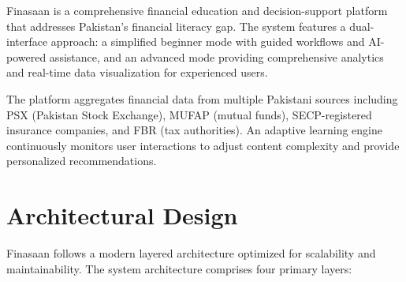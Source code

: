 \documentclass[12pt,a4paper]{report}
\begin{document}
Finasaan is a comprehensive financial education and decision-support platform that addresses Pakistan's financial literacy gap. The system features a dual-interface approach: a simplified beginner mode with guided workflows and AI-powered assistance, and an advanced mode providing comprehensive analytics and real-time data visualization for experienced users.

The platform aggregates financial data from multiple Pakistani sources including PSX (Pakistan Stock Exchange), MUFAP (mutual funds), SECP-registered insurance companies, and FBR (tax authorities). An adaptive learning engine continuously monitors user interactions to adjust content complexity and provide personalized recommendations.

\section{Architectural Design}

Finasaan follows a modern layered architecture optimized for scalability and maintainability. The system architecture comprises four primary layers:
\end{document}

